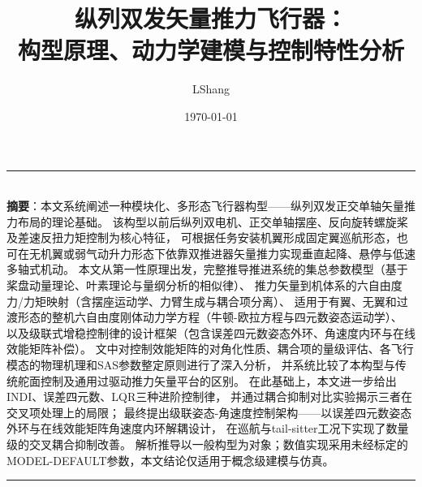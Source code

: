 


\title{\textbf{纵列双发矢量推力飞行器：\\构型原理、动力学建模与控制特性分析}}
\author{LShang}
\date{\today}



\begin{titlepage}
\maketitle
\thispagestyle{empty}

\begin{center}
\rule{0.6\textwidth}{0.5pt}\\[6pt]
{\small
\textbf{摘要}：本文系统阐述一种模块化、多形态飞行器构型——纵列双发正交单轴矢量推力布局的理论基础。
该构型以前后纵列双电机、正交单轴摆座、反向旋转螺旋桨及差速反扭力矩控制为核心特征，
可根据任务安装机翼形成固定翼巡航形态，也可在无机翼或弱气动升力形态下依靠双推进器矢量推力实现垂直起降、悬停与低速多轴式机动。
本文从第一性原理出发，完整推导推进系统的集总参数模型（基于桨盘动量理论、叶素理论与量纲分析的相似律）、
推力矢量到机体系的六自由度力/力矩映射（含摆座运动学、力臂生成与耦合项分离）、
适用于有翼、无翼和过渡形态的整机六自由度刚体动力学方程（牛顿-欧拉方程与四元数姿态运动学）、
以及级联式增稳控制律的设计框架（包含误差四元数姿态外环、角速度内环与在线效能矩阵补偿）。
文中对控制效能矩阵的对角化性质、耦合项的量级评估、各飞行模态的物理机理和SAS参数整定原则进行了深入分析，
并系统比较了本构型与传统舵面控制及通用过驱动推力矢量平台的区别。
在此基础上，本文进一步给出INDI、误差四元数、LQR三种进阶控制律，
并通过耦合抑制对比实验揭示三者在交叉项处理上的局限；
最终提出级联姿态-角速度控制架构——以误差四元数姿态外环与在线效能矩阵角速度内环解耦设计，
在巡航与tail-sitter工况下实现了数量级的交叉耦合抑制改善。
解析推导以一般构型为对象；数值实现采用未经标定的MODEL-DEFAULT参数，本文结论仅适用于概念级建模与仿真。
}
\end{center}

\noindent\rule{\textwidth}{0.5pt}
\end{titlepage}

